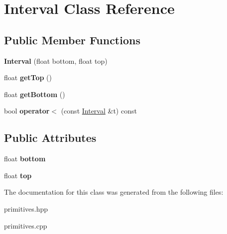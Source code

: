 \hypertarget{classInterval}{}\section{Interval Class Reference}
\label{classInterval}
\subsection*{Public Member Functions}
\begin{DoxyCompactItemize}
\item 
\mbox{\label{classInterval_ae110575371fc4dd190e90f9da3364de5}} 
{\bfseries Interval} (float bottom, float top)
\item 
\mbox{\label{classInterval_aaad630e0a28e903cf91f8d90376015dc}} 
float {\bfseries get\+Top} ()
\item 
\mbox{\label{classInterval_aebf44908f1bd7269db6d9202ac759cd7}} 
float {\bfseries get\+Bottom} ()
\item 
\mbox{\label{classInterval_a7c8c171ee63c5c60aa775b29cfa17eb1}} 
bool {\bfseries operator$<$} (const \hyperlink{classInterval}{Interval} \&t) const
\end{DoxyCompactItemize}
\subsection*{Public Attributes}
\begin{DoxyCompactItemize}
\item 
\mbox{\label{classInterval_a77635f902708975db1aab1204e6ba742}} 
float {\bfseries bottom}
\item 
\mbox{\label{classInterval_ad7405ca3f092fdae98971e38c95ece4f}} 
float {\bfseries top}
\end{DoxyCompactItemize}


The documentation for this class was generated from the following files\+:\begin{DoxyCompactItemize}
\item 
primitives.\+hpp\item 
primitives.\+cpp\end{DoxyCompactItemize}
